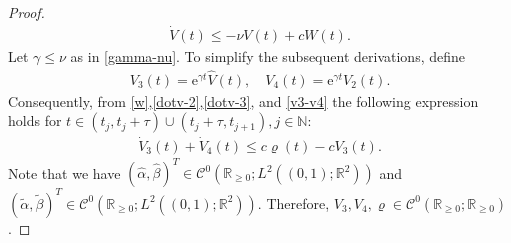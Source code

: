 \documentclass[letterpaper, 10 pt, conference]{ieeeconf}
\begin{document}
\begin{proof}
    \begin{align}
        \dot V(t)\leq -\nu V(t) + cW(t).\label{dotv-3}
    \end{align}
    Let $\gamma\leq\nu$ as in \eqref{gamma-nu}. To simplify the subsequent derivations, define
    \begin{align}
        V_3(t) = \mathrm{e}^{\gamma t}\hat V(t),\quad V_4(t) = \mathrm{e}^{\gamma t} V_2(t).\label{v3-v4}
    \end{align}
    Consequently, from \eqref{w},\eqref{dotv-2},\eqref{dotv-3}, and \eqref{v3-v4} the following expression holds for $t\in(t_j,t_j+\tau)\cup(t_j+\tau,t_{j+1}),j\in\mathbb{N}$:
    \begin{align}
        \dot V_3(t) + \dot V_4(t) \leq c\varrho(t) - cV_3(t).\label{dotv-4}
    \end{align}
    Note that we have $(\hat \alpha,\hat \beta)^T\in \mathcal{C}^0(\mathbb{R}_{\geq0};L^2((0,1);\mathbb{R}^2))$ and $(\tilde \alpha,\tilde \beta)^T\in \mathcal{C}^0(\mathbb{R}_{\geq0};L^2((0,1);\mathbb{R}^2))$. Therefore, $V_3,V_4,\varrho\in \mathcal{C}^0(\mathbb{R}_{\geq0};\mathbb{R}_{\geq0})$.
    

\end{proof}
\end{document}
